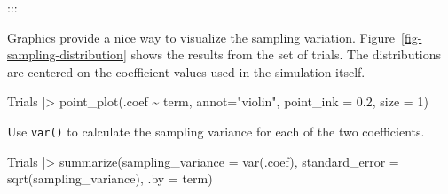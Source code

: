 \documentclass[
  letterpaper,
  DIV=11,
  numbers=noendperiod,
  oneside]{scrartcl}
\newenvironment{Shaded}{\begin{snugshade}}{\end{snugshade}}
\newcommand{\AttributeTok}[1]{\textcolor[rgb]{0.40,0.45,0.13}{#1}}
\newcommand{\DecValTok}[1]{\textcolor[rgb]{0.68,0.00,0.00}{#1}}
\newcommand{\FloatTok}[1]{\textcolor[rgb]{0.68,0.00,0.00}{#1}}
\newcommand{\FunctionTok}[1]{\textcolor[rgb]{0.28,0.35,0.67}{#1}}
\newcommand{\NormalTok}[1]{\textcolor[rgb]{0.00,0.23,0.31}{#1}}
\newcommand{\SpecialCharTok}[1]{\textcolor[rgb]{0.37,0.37,0.37}{#1}}
\newcommand{\StringTok}[1]{\textcolor[rgb]{0.13,0.47,0.30}{#1}}
\begin{document}
:::

Graphics provide a nice way to visualize the sampling variation.
Figure~\ref{fig-sampling-distribution} shows the results from the set of
trials. The distributions are centered on the coefficient values used in
the simulation itself.

\begin{Shaded}
\begin{Highlighting}[]
\NormalTok{Trials }\SpecialCharTok{|\textgreater{}} 
  \FunctionTok{point\_plot}\NormalTok{(.coef }\SpecialCharTok{\textasciitilde{}}\NormalTok{ term, }\AttributeTok{annot=}\StringTok{"violin"}\NormalTok{, }\AttributeTok{point\_ink =} \FloatTok{0.2}\NormalTok{, }\AttributeTok{size =} \DecValTok{1}\NormalTok{)}
\end{Highlighting}
\end{Shaded}

\begin{figure}[H]



\end{figure}%

Use \texttt{var()} to calculate the sampling variance for each of the
two coefficients.

\begin{Shaded}
\begin{Highlighting}[]
\NormalTok{Trials }\SpecialCharTok{|\textgreater{}}
  \FunctionTok{summarize}\NormalTok{(}\AttributeTok{sampling\_variance =} \FunctionTok{var}\NormalTok{(.coef), }
            \AttributeTok{standard\_error =} \FunctionTok{sqrt}\NormalTok{(sampling\_variance), }\AttributeTok{.by =}\NormalTok{ term)}
\end{Highlighting}
\end{Shaded}
\end{document}
